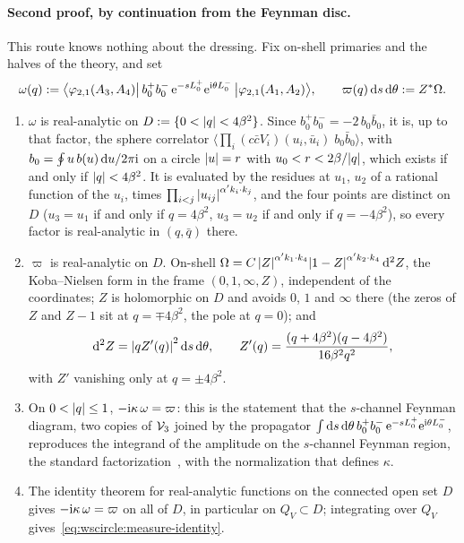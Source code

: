 \paragraph{Second proof, by continuation from the Feynman disc.}
This route knows nothing about the dressing.
Fix on-shell primaries and the halves of the theory, and set
\begin{equation}
  \omega(q)
    := \big\langle \varphi_{2,1}(A_3, A_4) \big| \, b_0^+ b_0^- \, \mathrm{e}^{- s L_0^+} \mathrm{e}^{\mathrm{i} \theta L_0^-} \, \big| \varphi_{2,1}(A_1, A_2) \big\rangle,
  \qquad
  \varpi(q) \, \mathrm{d} s \, \mathrm{d}\theta
    := Z^* \Omega.
\end{equation}
\begin{enumerate}
  \setlength{\itemsep}{0.5ex}

  \item $\omega$ is real-analytic on $D := \{ 0 < {|q|} < 4 \beta^2 \}$.
    Since $b_0^+ b_0^- = - 2 \, b_0 \bar b_0$, it is, up to that factor, the sphere correlator $\langle \prod_i (c \bar c V_i)(u_i, \bar u_i) \; b_0 \bar b_0 \rangle$, with $b_0 = \oint u \, b(u) \, \mathrm{d} u / 2 \pi \mathrm{i}$ on a circle ${|u|} = r$ with $u_0 < r < 2 \beta / {|q|}$, which exists if and only if ${|q|} < 4 \beta^2$.
    It is evaluated by the residues at $u_1$, $u_2$ of a rational function of the $u_i$, times $\prod_{i < j} {|u_{ij}|}^{\alpha' k_i \cdot k_j}$, and the four points are distinct on $D$ ($u_3 = u_1$ if and only if $q = 4 \beta^2$, $u_3 = u_2$ if and only if $q = - 4 \beta^2$), so every factor is real-analytic in $(q, \bar q)$ there.

  \item $\varpi$ is real-analytic on $D$.
    On-shell $\Omega = C \, {|Z|}^{\alpha' k_1 \cdot k_4} {|1 - Z|}^{\alpha' k_2 \cdot k_4} \, \mathrm{d}^2 Z$, the Koba--Nielsen form in the frame $(0, 1, \infty, Z)$, independent of the coordinates; $Z$ is holomorphic on $D$ and avoids $0$, $1$ and $\infty$ there (the zeros of $Z$ and $Z - 1$ sit at $q = \mp 4 \beta^2$, the pole at $q = 0$); and
    \begin{equation}
      \label{eq:wscircle:jacobian}
      \mathrm{d}^2 Z
        = {|q Z'(q)|}^2 \, \mathrm{d} s \, \mathrm{d}\theta,
      \qquad
      Z'(q)
        = \frac{(q + 4 \beta^2)(q - 4 \beta^2)}{16 \beta^2 q^2},
    \end{equation}
    with $Z'$ vanishing only at $q = \pm 4 \beta^2$.

  \item On $0 < {|q|} \leq 1$, $- \mathrm{i} \kappa \, \omega = \varpi$: this is the statement that the $s$-channel Feynman diagram, two copies of $\mathcal{V}_{3}$ joined by the propagator $\int \mathrm{d} s \, \mathrm{d}\theta \, b_0^+ b_0^- \, \mathrm{e}^{- s L_0^+} \mathrm{e}^{\mathrm{i} \theta L_0^-}$, reproduces the integrand of the amplitude on the $s$-channel Feynman region, the standard factorization~\cite{Erbin:2021:StringFieldTheory}, with the normalization that defines $\kappa$.

  \item The identity theorem for real-analytic functions on the connected open set $D$ gives $- \mathrm{i} \kappa \, \omega = \varpi$ on all of $D$, in particular on $Q_V \subset D$; integrating over $Q_V$ gives~\eqref{eq:wscircle:measure-identity}.
\end{enumerate}
